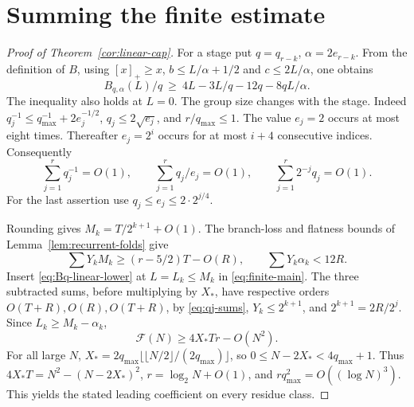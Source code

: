 \section{Summing the finite estimate}\label{sec:sum}
\begin{proof}[Proof of Theorem~\ref{cor:linear-cap}]
For a stage put \(q=q_{r-k}\), \(\alpha=2e_{r-k}\). From the definition of \(B\), using \([x]_+\ge x\), \(b\le L/\alpha+1/2\) and \(c\le2L/\alpha\), one obtains
\begin{equation}\label{eq:Bq-linear-lower}
 B_{q,\alpha}(L)/q\ \ge\ 4L-3L/q-12q-8qL/\alpha.
\end{equation}
The inequality also holds at \(L=0\). The group size changes with the stage. Indeed \(q_j^{-1}\le q_{\max}^{-1}+2e_j^{-1/2}\), \(q_j\le2\sqrt{e_j}\), and \(r/q_{\max}\le1\). The value \(e_j=2\) occurs at most eight times. Thereafter \(e_j=2^i\) occurs for at most \(i+4\) consecutive indices. Consequently
\begin{equation}\label{eq:qj-sums}
 \sum_{j=1}^r q_j^{-1}=O(1),\qquad \sum_{j=1}^r q_j/e_j=O(1),
 \qquad \sum_{j=1}^r 2^{-j}q_j=O(1).
\end{equation}
For the last assertion use \(q_j\le e_j\le 2\cdot2^{j/4}\).

Rounding gives \(M_k=T/2^{k+1}+O(1)\). The branch-loss and flatness bounds of Lemma~\ref{lem:recurrent-folds} give
\[
 \sum Y_k M_k\ge (r-5/2)T-O(R),\qquad \sum Y_k\alpha_k<12R.
\]
Insert \eqref{eq:Bq-linear-lower} at \(L=L_k\le M_k\) in \eqref{eq:finite-main}. The three subtracted sums, before multiplying by \(X_*\), have respective orders \(O(T+R), O(R), O(T+R)\), by \eqref{eq:qj-sums}, \(Y_k\le2^{k+1}\), and \(2^{k+1}=2R/2^j\). Since \(L_k\ge M_k-\alpha_k\),
\[
 \mathcal F(N)\ge 4X_*Tr-O(N^2).
\]
For all large \(N\), \(X_*=2q_{\max}\lfloor\lfloor N/2\rfloor/(2q_{\max})\rfloor\), so \(0\le N-2X_*<4q_{\max}+1\). Thus \(4X_*T=N^2-(N-2X_*)^2\), \(r=\log_2N+O(1)\), and \(rq_{\max}^2=O((\log N)^3)\). This yields the stated leading coefficient on every residue class.


\end{proof}
